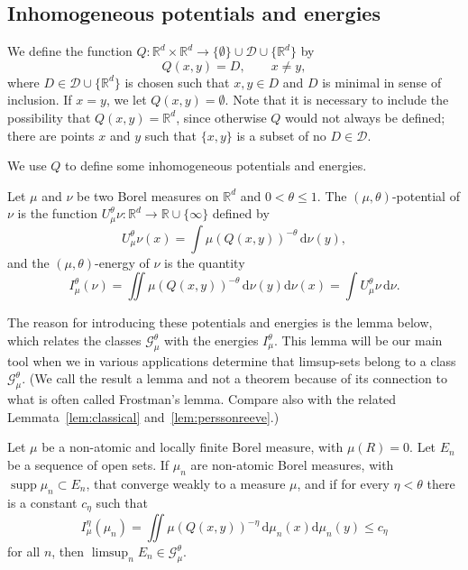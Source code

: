 \documentclass[AHL,Unicode,longabstracts]{cedram}
\DeclareMathOperator{\supp}{supp}
\newcommand*{\dd}{\mathrm{d}}
\begin{document}
\subsection{Inhomogeneous potentials and energies} \label{sec:inhomogeneous}

We define the function $Q \colon \mathbb{R}^d \times \mathbb{R}^d \to \{\emptyset \} \cup \mathscr{D} \cup \{\mathbb{R}^d\}$ by
\[
Q (x,y) = D, \qquad x \neq y,
\]
where $D \in \mathscr{D} \cup \{ \mathbb{R}^d \}$ is chosen such that $x,y \in D$ and $D$ is minimal in sense of inclusion. If $x = y$, we let $Q (x,y) = \emptyset$. Note that it is necessary to include the possibility that $Q (x,y) = \mathbb{R}^d$, since otherwise $Q$ would not always be defined; there are points $x$ and $y$ such that $\{x, y\}$ is a subset of no $D \in \mathscr{D}$.

We use $Q$ to define some inhomogeneous potentials and energies.

\begin{defi}
Let $\mu$ and $\nu$ be two Borel measures on $\mathbb{R}^d$ and $0 < \theta \leq 1$. The $(\mu, \theta)$-potential of $\nu$ is the function $U_\mu^\theta \nu \colon \mathbb{R}^d \to \mathbb{R} \cup \{\infty\}$ defined by
\[
U_\mu^\theta \nu (x) = \int \mu (Q(x,y))^{-\theta} \, \dd \nu (y),
\]
and the $(\mu,\theta)$-energy of $\nu$ is the quantity
\[
I_\mu^\theta (\nu) = \iint \mu (Q(x,y))^{-\theta} \, \dd \nu (y) \dd \nu (x) = \int U_\mu^\theta \nu \, \dd \nu.
\]
\end{defi}

The reason for introducing these potentials and energies is the lemma below, which relates the classes $\mathscr{G}_\mu^\theta$ with the energies $I_\mu^\theta$. This lemma will be our main tool when we in various applications determine that limsup-sets belong to a class $\mathscr{G}_\mu^\theta$. (We call the result a lemma and not a theorem because of its connection to what is often called Frostman's lemma. Compare also with the related Lemmata~\ref{lem:classical} and~\ref{lem:perssonreeve}.)

\begin{lemm}\label{lem:frostman}
Let $\mu$ be a non-atomic and locally finite Borel measure, with $\mu (R) = 0$. Let $E_n$ be a sequence of open sets. If $\mu_n$ are non-atomic Borel measures, with $\supp \mu_n \subset E_n$, that converge weakly to a measure $\mu$, and if for every $\eta < \theta$ there is a constant $c_\eta$ such that
\[
I_\mu^\eta (\mu_n) = \iint \mu (Q(x,y))^{-\eta} \, \dd \mu_n (x) \dd \mu_n (y) \leq c_\eta
\]
for all $n$, then $\limsup_n E_n \in \mathscr{G}_\mu^\theta$.
\end{lemm}
\end{document}
